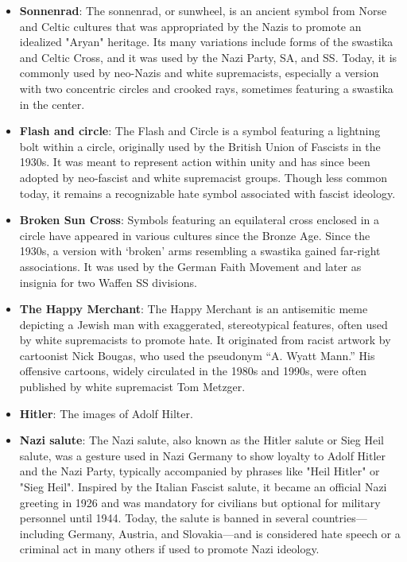 \documentclass[11pt,a4paper,onecolumn]{article}
\begin{document}
\begin{itemize}
  \item \textbf{Sonnenrad}: The sonnenrad, or sunwheel, is an ancient symbol
  from Norse and Celtic cultures that was appropriated by the Nazis to
  promote an idealized "Aryan" heritage. Its many variations include forms
  of the swastika and Celtic Cross, and it was used by the Nazi Party,
  SA, and SS. Today, it is commonly used by neo-Nazis and white
  supremacists, especially a version with two concentric circles and
  crooked rays, sometimes featuring a swastika in the center.
  \item \textbf{Flash and circle}: The Flash and Circle is a symbol featuring
  a lightning bolt within a circle, originally used by the British Union
  of Fascists in the 1930s. It was meant to represent action within unity
  and has since been adopted by neo-fascist and white supremacist groups.
  Though less common today, it remains a recognizable hate symbol associated
  with fascist ideology.
  \item \textbf{Broken Sun Cross}: Symbols featuring an equilateral cross enclosed
  in a circle have appeared in various cultures since the Bronze Age. Since
  the 1930s, a version with ‘broken’ arms resembling a swastika gained far-right
  associations. It was used by the German Faith Movement and later as insignia
  for two Waffen SS divisions.
  \item \textbf{The Happy Merchant}: The Happy Merchant is an antisemitic meme
  depicting a Jewish man with exaggerated, stereotypical features, often used
  by white supremacists to promote hate. It originated from racist artwork
  by cartoonist Nick Bougas, who used the pseudonym “A. Wyatt Mann.” His
  offensive cartoons, widely circulated in the 1980s and 1990s, were often
  published by white supremacist Tom Metzger.
  \item \textbf{Hitler}: The images of Adolf Hilter.
  \item \textbf{Nazi salute}: The Nazi salute, also known as the Hitler salute
  or Sieg Heil salute, was a gesture used
  in Nazi Germany to show loyalty to Adolf Hitler and the Nazi Party, typically
  accompanied by phrases like "Heil Hitler" or "Sieg Heil". Inspired by the
  Italian Fascist salute, it became an official Nazi greeting in 1926 and
  was mandatory for civilians but optional for military personnel until
  1944. Today, the salute is banned in several countries—including Germany,
  Austria, and Slovakia—and is considered hate speech or a criminal act in
  many others if used to promote Nazi ideology.

\end{itemize}
\end{document}
